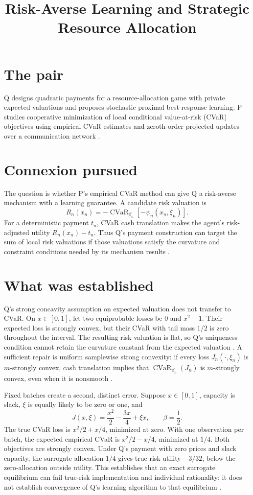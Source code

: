 \documentclass{article}
\title{Risk-Averse Learning and Strategic Resource Allocation}
\begin{document}
\maketitle

\section{The pair}

Q designs quadratic payments for a resource-allocation game with private expected valuations and proposes stochastic proximal best-response learning. P studies cooperative minimization of local conditional value-at-risk (CVaR) objectives using empirical CVaR estimates and zeroth-order projected updates over a communication network .

\section{Connexion pursued}

The question is whether P's empirical CVaR method can give Q a risk-averse mechanism with a learning guarantee. A candidate risk valuation is
\[
R_n(x_n)=-\operatorname{CVaR}_{\beta_n}\!\left[-\psi_n(x_n,\xi_n)\right].
\]
For a deterministic payment \(t_n\), CVaR cash translation makes the agent's risk-adjusted utility \(R_n(x_n)-t_n\). Thus Q's payment construction can target the sum of local risk valuations if those valuations satisfy the curvature and constraint conditions needed by its mechanism results .

\section{What was established}

Q's strong concavity assumption on expected valuation does not transfer to CVaR. On \(x\in[0,1]\), let two equiprobable losses be \(0\) and \(x^2-1\). Their expected loss is strongly convex, but their CVaR with tail mass \(1/2\) is zero throughout the interval. The resulting risk valuation is flat, so Q's uniqueness condition cannot retain the curvature constant from the expected valuation . A sufficient repair is uniform samplewise strong convexity: if every loss \(J_n(\cdot,\xi_n)\) is \(m\)-strongly convex, cash translation implies that \(\operatorname{CVaR}_{\beta_n}(J_n)\) is \(m\)-strongly convex, even when it is nonsmooth .

Fixed batches create a second, distinct error. Suppose \(x\in[0,1]\), capacity is slack, \(\xi\) is equally likely to be zero or one, and
\[
J(x,\xi)=\frac{x^2}{2}-\frac{3x}{4}+\xi x,
\qquad \beta=\frac12.
\]
The true CVaR loss is \(x^2/2+x/4\), minimized at zero. With one observation per batch, the expected empirical CVaR is \(x^2/2-x/4\), minimized at \(1/4\). Both objectives are strongly convex. Under Q's payment with zero prices and slack capacity, the surrogate allocation \(1/4\) gives true risk utility \(-3/32\), below the zero-allocation outside utility. This establishes that an exact surrogate equilibrium can fail true-risk implementation and individual rationality; it does not establish convergence of Q's learning algorithm to that equilibrium .
\end{document}
